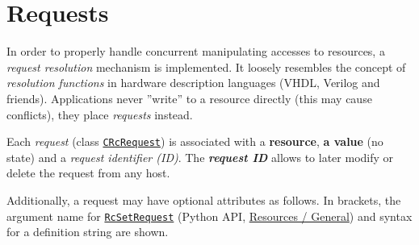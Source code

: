 \documentclass[12pt,english,parskip=half,headheight=19pt]{scrreprt}
\newcommand{\refapic}[1]{\href{home2l-api_c/index.html}{\mbox{\texttt{#1}}}}            %
\newcommand{\refapipython}[1]{\href{home2l-api_python/index.html}{\mbox{\texttt{#1}}}}  %
\newcommand{\refapipythongroup}[2]{\href{home2l-api_python/group__#1.html}{#2}}
\begin{document}
\section{Requests}
\label{sec:resources-requests}


In order to properly handle concurrent manipulating accesses to resources, a \textit{request resolution} mechanism is implemented. It loosely resembles the concept of \textit{resolution functions} in hardware description languages (VHDL, Verilog and friends).
Applications never ''write'' to a resource directly (this may cause conflicts), they place \textit{requests} instead.

Each \textit{request} (class \refapic{CRcRequest}) is associated with a
\textbf{resource}, \textbf{a value} (no state) and a \textit{request identifier (ID)}. The
\textbf{\textit{request ID}} allows to later modify or delete the request from any host.

Additionally, a request may have optional attributes as follows. In brackets, the argument name for \refapipython{RcSetRequest}
(Python API, \refapipythongroup{resources__general}{Resources / General}) and syntax for a definition string are shown.
\end{document}
